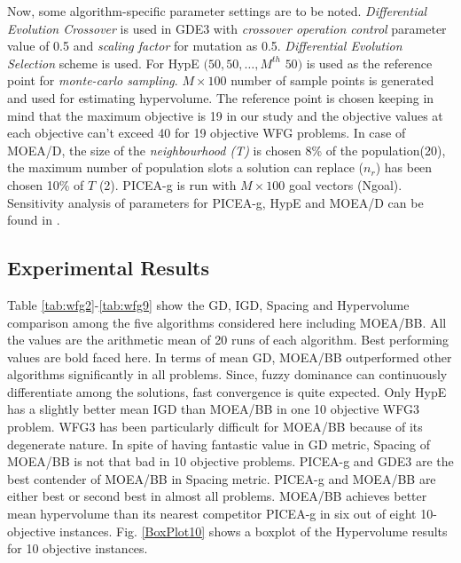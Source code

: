 \documentclass[journal]{IEEEtran}
\begin{document}
Now, some algorithm-specific parameter settings are to be noted. \textit{Differential Evolution Crossover} is used in GDE3 with \textit{crossover operation control} parameter value of 0.5 and \textit{scaling factor} for mutation as 0.5.\textit{ Differential Evolution Selection} scheme is used. For HypE $(50,50,\dots ,M^{th}$ $50)$ is used as the reference point for \textit{monte-carlo sampling}. $M \times 100$ number of sample points is generated and used for estimating hypervolume. The reference point is chosen keeping in mind that the maximum objective is 19 in our study and the objective values at each objective can’t exceed 40 for 19 objective WFG problems. In case of MOEA/D, the size of the \textit{neighbourhood (T)} is chosen 8\% of the population(20), the maximum number of population slots a solution can replace ($n_r$) has been chosen 10\% of $T$ (2). PICEA-g is run with $M \times 100$ goal vectors (Ngoal). Sensitivity analysis of parameters for PICEA-g, HypE and MOEA/D can be found in \cite{wang2013preference}.


\subsection{Experimental Results}
\label{sec:exp:res}
Table \ref{tab:wfg2}-\ref{tab:wfg9} show the GD, IGD, Spacing and Hypervolume comparison among the five algorithms considered here including MOEA/BB. All the values are the arithmetic mean of 20 runs of each algorithm. Best performing values are bold faced here. In terms of mean GD, MOEA/BB outperformed other algorithms significantly in all problems. Since, fuzzy dominance can continuously differentiate among the solutions, fast convergence is quite expected. Only HypE has a slightly better mean IGD than MOEA/BB in one 10 objective WFG3 problem. WFG3 has been particularly difficult for MOEA/BB because of its degenerate nature. In spite of having fantastic value in GD metric, Spacing of MOEA/BB is not that bad in 10 objective problems. PICEA-g and GDE3 are the best contender of MOEA/BB in Spacing metric. PICEA-g and MOEA/BB are either best or second best in almost all problems. MOEA/BB achieves better mean hypervolume than its nearest competitor PICEA-g in six out of eight 10-objective instances.
Fig. \ref{BoxPlot10} shows a boxplot of the Hypervolume results for 10 objective instances.
\end{document}
